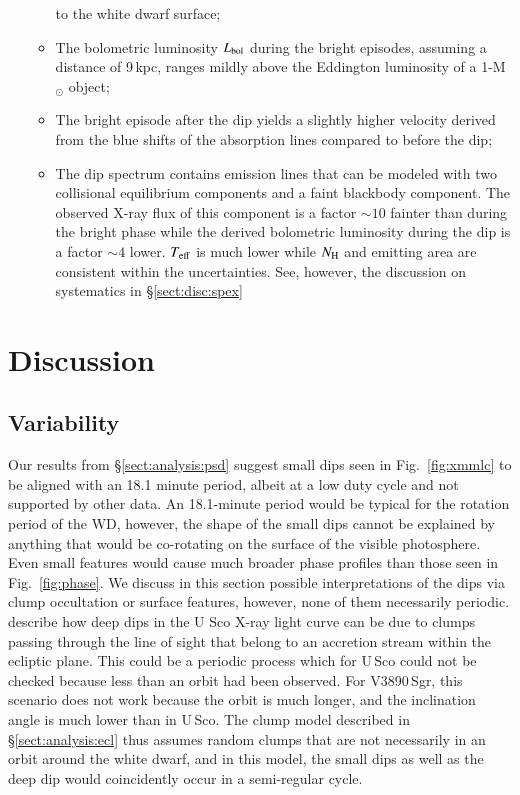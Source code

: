 \documentclass{aa}
\begin{document}
\begin{itemize}
\begin{itemize}
    to the white dwarf surface;
   \item The bolometric luminosity $L_{\rm bol}$ during the bright episodes, assuming
     a distance of 9\,kpc, ranges mildly above the Eddington luminosity of a 1-M$_\odot$ object;
    \item The bright episode after the dip yields a slightly
      higher velocity derived from the blue shifts of the absorption lines
      compared to before the dip;
    \item The dip spectrum contains emission lines that can be modeled with
      two collisional equilibrium components and a faint blackbody component.
      The observed X-ray flux of this component is a factor
      $\sim 10$ fainter than during the bright phase while the derived bolometric
      luminosity during the dip is a factor $\sim 4$ lower. $T_{\rm eff}$
      is much lower while $N_{\rm H}$ and emitting area are consistent within the
      uncertainties. See, however, the discussion on systematics in \S\ref{sect:disc:spex}
  \end{itemize}

\end{itemize}

\section{Discussion}
\label{sect:disc}

\subsection{Variability}
\label{sect:disc:pulse}

Our results from \S\ref{sect:analysis:psd} suggest small dips seen
in Fig.~\ref{fig:xmmlc} to be aligned with an 18.1 minute period, albeit
at a low duty cycle and not supported by other data.
An 18.1-minute period would be typical for the rotation period of the
WD, however, the shape of the small dips cannot be explained by
anything that would be co-rotating on the surface of the visible
photosphere. Even small features would cause much broader phase
profiles than those seen in Fig.~\ref{fig:phase}. We discuss in this
section possible interpretations of the dips via clump occultation
or surface features, however, none of them necessarily periodic.\\

\cite{nessusco} describe how deep dips in the U Sco X-ray light curve
can be due to clumps passing through the line of sight that belong to
an accretion stream within the ecliptic plane. This could be a periodic
process which for U\,Sco could not be checked because less than an
orbit had been observed. For V3890\,Sgr, this scenario does not work
because the orbit is much longer, and the inclination angle is much
lower than in U\,Sco. The clump model described in
\S\ref{sect:analysis:ecl} thus assumes random clumps that are not
necessarily in an orbit around the white dwarf, and in this model,
the small dips as well as the deep dip would
coincidently occur in a semi-regular cycle.\\
\end{document}
